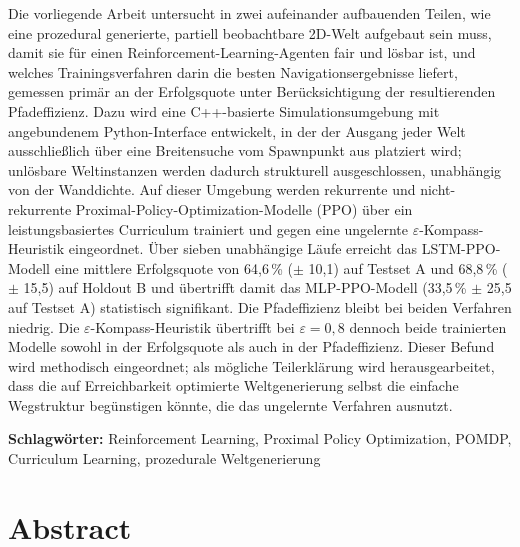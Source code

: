 \documentclass[
  a4paper,
  11pt,
  twoside,
  BCOR=8mm,           %
  headings=big,
  numbers=noenddot,
  listof=totoc,       %
  captions=tableheading,
]{scrreprt}
\begin{document}
Die vorliegende Arbeit untersucht in zwei aufeinander aufbauenden Teilen, wie
eine prozedural generierte, partiell beobachtbare 2D-Welt aufgebaut sein muss,
damit sie für einen Reinforcement-Learning-Agenten fair und lösbar ist, und
welches Trainingsverfahren darin die besten Navigationsergebnisse liefert,
gemessen primär an der Erfolgsquote unter Berücksichtigung der resultierenden
Pfadeffizienz. Dazu wird eine C++-basierte Simulationsumgebung mit
angebundenem Python-Interface entwickelt, in der der Ausgang jeder Welt
ausschließlich über eine Breitensuche vom Spawnpunkt aus platziert wird;
unlösbare Weltinstanzen werden dadurch strukturell ausgeschlossen, unabhängig
von der Wanddichte. Auf dieser Umgebung werden rekurrente und
nicht-rekurrente Proximal-Policy-Optimization-Modelle (PPO) über ein
leistungsbasiertes Curriculum trainiert und gegen eine ungelernte
$\varepsilon$-Kompass-Heuristik eingeordnet. Über sieben unabhängige Läufe
erreicht das LSTM-PPO-Modell eine mittlere Erfolgsquote von 64,6\,\%
($\pm$ 10,1) auf Testset A und 68,8\,\% ($\pm$ 15,5) auf Holdout B und
übertrifft damit das MLP-PPO-Modell (33,5\,\% $\pm$ 25,5 auf Testset A)
statistisch signifikant. Die Pfadeffizienz bleibt bei beiden Verfahren
niedrig. Die $\varepsilon$-Kompass-Heuristik übertrifft bei
$\varepsilon = 0{,}8$ dennoch beide trainierten Modelle sowohl in der
Erfolgsquote als auch in der Pfadeffizienz. Dieser Befund wird methodisch
eingeordnet; als mögliche Teilerklärung wird herausgearbeitet, dass die auf
Erreichbarkeit optimierte Weltgenerierung selbst die einfache Wegstruktur
begünstigen könnte, die das ungelernte Verfahren ausnutzt.

\bigskip
\noindent\textbf{Schlagwörter:} Reinforcement Learning, Proximal Policy
Optimization, POMDP, Curriculum Learning, prozedurale Weltgenerierung

\clearpage

\chapter*{Abstract}
\thispagestyle{empty}
\end{document}
